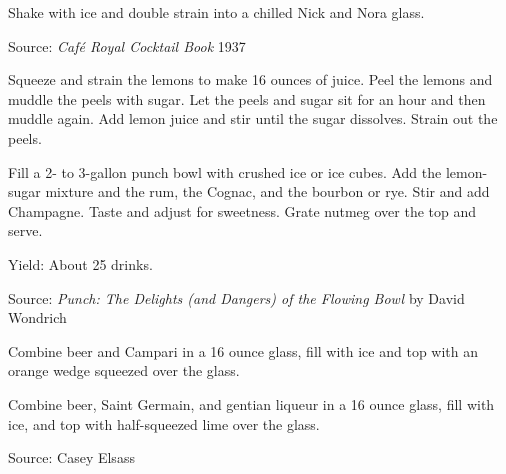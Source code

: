 \documentclass[letterpaper]{recipePMG}
\begin{document}
Shake with ice and double strain into a chilled Nick and Nora glass.

Source: \textit{Caf\'{e} Royal Cocktail Book} 1937




Squeeze and strain the lemons to make 16 ounces of juice. Peel the lemons and muddle the peels with sugar. Let the peels and sugar sit for an hour and then muddle again. Add lemon juice and stir until the sugar dissolves. Strain out the peels.

Fill a 2- to 3-gallon punch bowl with crushed ice or ice cubes. Add the lemon-sugar mixture and the rum, the Cognac, and the bourbon or rye. Stir and add Champagne. Taste and adjust for sweetness. Grate nutmeg over the top and serve.

Yield: About 25 drinks.

Source: \textit{Punch: The Delights (and Dangers) of the Flowing Bowl} by David Wondrich





Combine beer and Campari in a 16 ounce glass, fill with ice and top with an orange wedge squeezed over the glass.

\newpage



Combine beer, Saint Germain, and gentian liqueur in a 16 ounce glass, fill with ice, and top with half-squeezed lime over the glass.

Source: Casey Elsass


\end{document}
